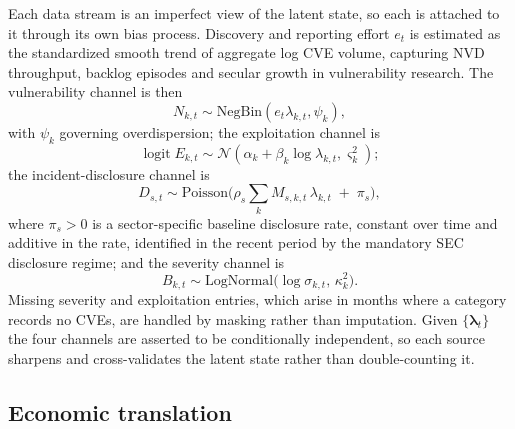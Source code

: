 \documentclass[review]{elsarticle}
\begin{document}
Each data stream is an imperfect view of the latent state, so each is attached to it through its own bias process. Discovery and reporting effort $e_t$ is estimated as the standardized smooth trend of aggregate log CVE volume, capturing NVD throughput, backlog episodes and secular growth in vulnerability research. The vulnerability channel is then
\begin{equation}\label{eq:obs-cve}
    N_{k,t} \sim \text{NegBin}(e_t \lambda_{k,t}, \psi_k),
\end{equation}
with $\psi_k$ governing overdispersion; the exploitation channel is
\begin{equation}\label{eq:obs-epss}
    \operatorname{logit} E_{k,t} \sim \mathcal{N}(\alpha_k + \beta_k \log \lambda_{k,t}, \varsigma_k^2);
\end{equation}
the incident-disclosure channel is
\begin{equation}\label{eq:obs-8k}
    D_{s,t} \sim \text{Poisson}\Big(\rho_s \textstyle\sum_k M_{s,k,t}\, \lambda_{k,t} \;+\; \pi_s\Big),
\end{equation}
where $\pi_s > 0$ is a sector-specific baseline disclosure rate, constant over time and additive in the rate, identified in the recent period by the mandatory SEC disclosure regime; and the severity channel is
\begin{equation}\label{eq:obs-cvss}
    B_{k,t} \sim \text{LogNormal}\big(\log \sigma_{k,t},\, \kappa_k^2\big).
\end{equation}
Missing severity and exploitation entries, which arise in months where a category records no CVEs, are handled by masking rather than imputation. Given $\{\bm{\lambda}_t\}$ the four channels are asserted to be conditionally independent, so each source sharpens and cross-validates the latent state rather than double-counting it.

\subsection{Economic translation}
\end{document}
